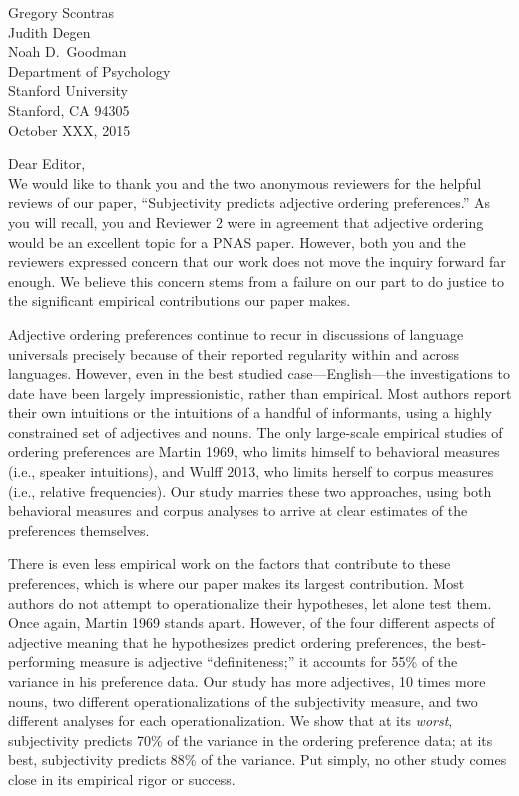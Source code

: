 \documentclass[12pt]{article}
\begin{document}
{\flushright

\vspace{25pt}
Gregory Scontras\\
Judith Degen\\
Noah D.~Goodman\\
Department of Psychology\\
Stanford University\\
Stanford, CA 94305\\[20pt]

\noindent October XXX, 2015\\[20pt]}


\noindent Dear Editor,\\

\noindent We would like to thank you and the two anonymous reviewers for the helpful reviews of our paper, ``Subjectivity predicts adjective ordering preferences.'' As you will recall, you and Reviewer 2 were in agreement that adjective ordering would be an excellent topic for a PNAS paper. However, both you and the reviewers expressed concern that our work does not move the inquiry forward far enough. We believe this concern stems from a failure on our part to do justice to the significant empirical contributions our paper makes.

Adjective ordering preferences continue to recur in discussions of language universals precisely because of their reported regularity within and across languages. However, even in the best studied case---English---the investigations to date have been largely impressionistic, rather than empirical. Most authors report their own intuitions or the intuitions of a handful of informants, using a highly constrained set of adjectives and nouns. The only large-scale empirical studies of ordering preferences are Martin 1969, who limits himself to behavioral measures (i.e., speaker intuitions), and Wulff 2013, who limits herself to corpus measures (i.e., relative frequencies). Our study marries these two approaches, using both behavioral measures and corpus analyses to arrive at clear estimates of the  preferences themselves.

There is even less empirical work on the factors that contribute to these preferences, which is where our paper makes its largest contribution. Most authors do not attempt to operationalize their hypotheses, let alone test them. Once again, Martin 1969 stands apart. However, of the four different aspects of adjective meaning that he hypothesizes predict ordering preferences, the best-performing measure is adjective ``definiteness;'' it accounts for 55\% of the variance in his preference data. Our study has more adjectives, 10 times more nouns, two different operationalizations of the subjectivity measure, and two different analyses for each operationalization. We show that at its \emph{worst}, subjectivity predicts 70\% of the variance in the ordering preference data; at its best, subjectivity predicts 88\% of the variance. Put simply, no other study comes close in its empirical rigor or success.
\end{document}
